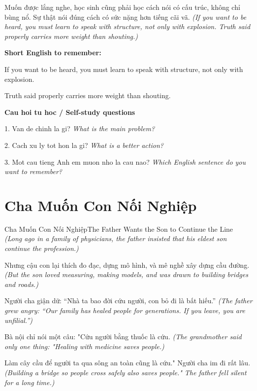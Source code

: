 \begin{baihoc}
Muốn được lắng nghe, học sinh cũng phải học cách nói có cấu trúc, không chỉ bùng nổ. Sự thật nói đúng cách có sức nặng hơn tiếng cãi vã.
\textit{(If you want to be heard, you must learn to speak with structure, not only with explosion. Truth said properly carries more weight than shouting.)}
\end{baihoc}

\begin{ghinhoanh}
\textbf{Short English to remember:}

If you want to be heard, you must learn to speak with structure, not only with explosion.

Truth said properly carries more weight than shouting.

\end{ghinhoanh}

\begin{tuhocnhanh}
\textbf{Cau hoi tu hoc / Self-study questions}

1. Van de chinh la gi? \textit{What is the main problem?}

2. Cach xu ly tot hon la gi? \textit{What is a better action?}

3. Mot cau tieng Anh em muon nho la cau nao? \textit{Which English sentence do you want to remember?}
\end{tuhocnhanh}
\ngancach

\section{Cha Muốn Con Nối Nghiệp}
\begin{truyen}{Cha Muốn Con Nối Nghiệp}{The Father Wants the Son to Continue the Line}
\textit{(Long ago in a family of physicians, the father insisted that his eldest son continue the profession.)}

Nhưng cậu con lại thích đo đạc, dựng mô hình, và mê nghề xây dựng cầu đường.
\textit{(But the son loved measuring, making models, and was drawn to building bridges and roads.)}

Người cha giận dữ: ``Nhà ta bao đời cứu người, con bỏ đi là bất hiếu.''
\textit{(The father grew angry: ``Our family has healed people for generations. If you leave, you are unfilial.'')}

Bà nội chỉ nói một câu: "Cứu người bằng thuốc là cứu.
\textit{(The grandmother said only one thing: "Healing with medicine saves people.)}

Làm cây cầu để người ta qua sông an toàn cũng là cứu." Người cha im đi rất lâu.
\textit{(Building a bridge so people cross safely also saves people." The father fell silent for a long time.)}

\end{truyen}

